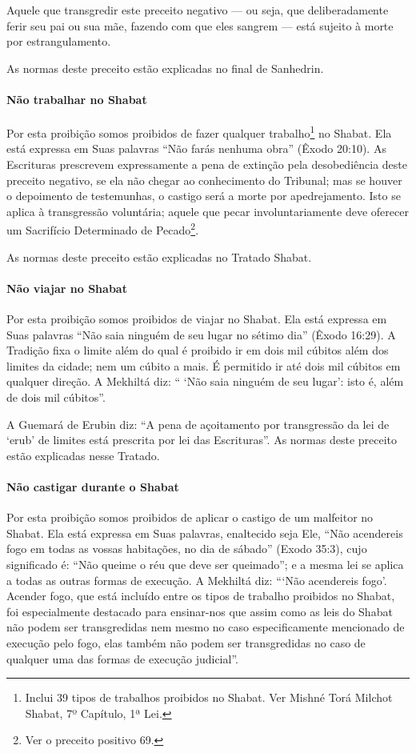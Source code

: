 Aquele que transgredir este preceito negativo --- ou seja, que deliberadamente ferir seu pai ou sua mãe, fazendo com que eles sangrem --- está sujeito à morte por estrangulamento.

As normas deste preceito estão explicadas no final de Sanhedrin.

\paragraph{Não trabalhar no Shabat}

Por esta proibição somos proibidos de fazer qualquer
trabalho\footnote{Inclui 39 tipos de trabalhos proibidos no Shabat. Ver Mishné Torá
  Milchot Shabat, 7º Capítulo, 1ª Lei.} no Shabat. Ela está expressa em Suas
palavras ``Não farás nenhuma obra'' (Êxodo 20:10). As Escrituras
prescrevem expressamente a pena de extinção pela desobediência deste
preceito negativo, se ela não chegar ao conhecimento do Tribunal; mas se
houver o depoimento de testemunhas, o castigo será a morte por
apedrejamento. Isto se aplica à transgressão voluntária; aquele que
pecar involuntariamente deve oferecer um Sacrifício Determinado de
Pecado\footnote{Ver o preceito positivo 69.}.

As normas deste preceito estão explicadas no Tratado Shabat.

\paragraph{Não viajar no Shabat}

Por esta proibição somos proibidos de viajar no Shabat. Ela está
expressa em Suas palavras ``Não saia ninguém de seu lugar no sétimo
dia'' (Êxodo 16:29). A Tradição fixa o limite além do qual é proibido ir
em dois mil cúbitos além dos limites da cidade; nem um cúbito a mais. É
permitido ir até dois mil cúbitos em qualquer direção. A Mekhiltá diz:
`` `Não saia ninguém de seu lugar': isto é, além de dois mil cúbitos''.

A Guemará de Erubin diz: ``A pena de açoitamento por transgressão da lei
de `erub' de limites está prescrita por lei das Escrituras''. As normas
deste preceito estão explicadas nesse Tratado.

\paragraph{Não castigar durante o Shabat}

Por esta proibição somos proibidos de aplicar o castigo de um malfeitor
no Shabat. Ela está expressa em Suas palavras, enaltecido seja Ele,
``Não acendereis fogo em todas as vossas habitações, no dia de sábado''
(Exodo 35:3), cujo significado é: ``Não queime o réu que deve ser
queimado''; e a mesma lei se aplica a todas as outras formas de
execução. A Mekhiltá diz: ```Não acendereis fogo'. Acender fogo, que
está incluído entre os tipos de trabalho proibidos no Shabat, foi
especialmente destacado para ensinar-nos que assim como as leis do
Shabat não podem ser transgredidas nem mesmo no caso especificamente
mencionado de execução pelo fogo, elas também não podem ser
transgredidas no caso de qualquer uma das formas de execução judicial''.

